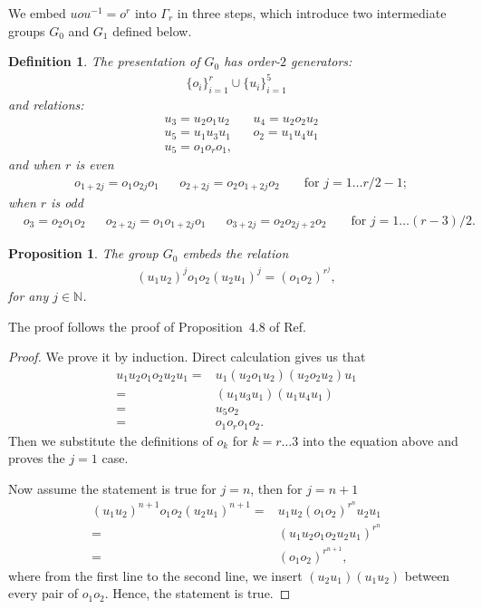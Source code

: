 \documentclass[11pt,letterpaper]{article}
\newcommand{\N}{\mathbb{N}}
\newcommand{\1}{\mathbb{1}}
\newtheorem{proposition}[theorem]{Proposition}
\newtheorem{definition}[theorem]{Definition}
\theoremstyle{definition}
\begin{document}
We embed $uou^{-1}= o^r$ into $\Gamma_r$ in three steps, which introduce two intermediate groups $G_0$ and $G_1$ defined below.
\begin{definition}	
\label{def:g0}
	The presentation of $G_0$ has order-$2$ generators:
	\begin{align*}
		\{o_i\}_{i=1}^{r} \cup \{u_i\}_{i=1}^5
	\end{align*}
	and relations:
	\begin{align*}
	&u_3 = u_2o_1u_2 && u_4 = u_2o_2u_2 \\
	&u_5 = u_1u_3u_1 && o_2 = u_1u_4u_1\\
	&u_5 = o_1 o_r o_1,
	\end{align*}
	and when $r$ is even
	\begin{align*}
	&o_{1+2j} = o_1o_{2j}o_1 && o_{2+2j} = o_2o_{1+2j}o_2&& \text{ for } j = 1 \dots r/2 - 1;
	\end{align*}
	when $r$ is odd
	\begin{align*}
	&o_3 = o_2o_1o_2 &&
	 o_{2+2j} =o_1o_{1+2j}o_1 && o_{3+2j} = o_2o_{2j+2}o_2 &&\text{ for } j = 1 \dots (r-3)/2.
	\end{align*}
\end{definition}
\begin{proposition}
	The group $G_0$ embeds the relation 
	\begin{align}
		(u_1u_2)^j o_1o_2 (u_2u_1)^j = (o_1o_2)^{r^j}, 
	\end{align}
	for any $ j \in \N$.
\end{proposition}
The proof follows the proof of Proposition~$4.8$ of Ref.~\cite{slofstra2017}
\begin{proof}
	We prove it by induction.
	Direct calculation gives us that
	\begin{align*} 
		u_1u_2 o_1o_2 u_2u_1 = &u_1 (u_2 o_1u_2) (u_2o_2 u_2) u_1 \\
	=& (u_1 u_3 u_1) (u_1 u_4 u_1)\\
	=& u_5 o_2\\
	=& o_1o_ro_1 o_2.
	\end{align*}
	Then we substitute the definitions of $o_k$ for $k = r \dots 3$ into the equation above and
	proves the $j=1$ case.
	
	Now assume the statement is true for $j = n$, then for $j = n+1$
	\begin{align*}
		(u_1u_2)^{n+1} o_1o_2 (u_2u_1)^{n+1} =& u_1u_2 (o_1o_2)^{r^n} u_2u_1 \\ 
		 =& (u_1u_2 o_1o_2 u_2u_1)^{r^n} \\
		 =& (o_1o_2)^{r^{n+1}},
	\end{align*}
	where from the first line to the second line, we insert $(u_2u_1)(u_1u_2)$ between every pair of $o_1o_2$.
	Hence, the statement is true.
\end{proof}
\end{document}

